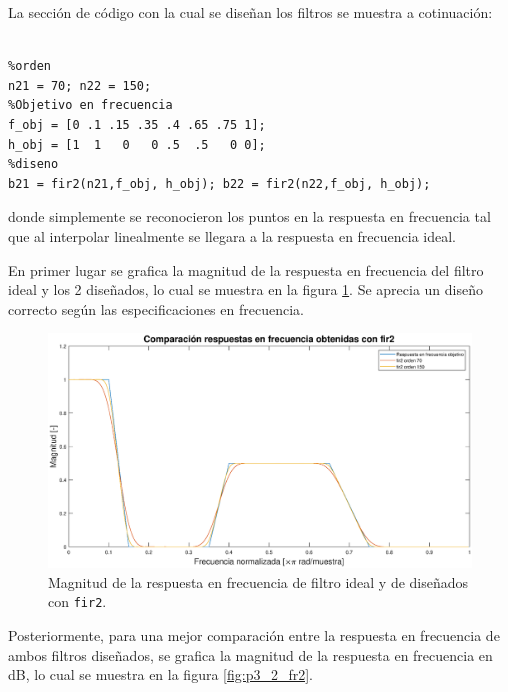 \begin{enumerate}
La sección de código con la cual se diseñan los filtros se muestra a cotinuación:
\begin{lstlisting}[frame = single]
%%% 2. Diseno de filtros FIR usando fir2

%orden 
n21 = 70; n22 = 150;
%Objetivo en frecuencia
f_obj = [0 .1 .15 .35 .4 .65 .75 1];
h_obj = [1  1   0   0 .5  .5   0 0];
%diseno
b21 = fir2(n21,f_obj, h_obj); b22 = fir2(n22,f_obj, h_obj);
\end{lstlisting}
donde simplemente se reconocieron los puntos en la respuesta en frecuencia tal que al interpolar linealmente se llegara a la respuesta en frecuencia ideal.

En primer lugar se grafica la magnitud de la respuesta en frecuencia del filtro ideal y los 2 diseñados, lo cual se muestra en la figura \ref{fig:p3_2_fr1}. Se aprecia un diseño correcto según las especificaciones en frecuencia.
\begin{figure}[H]
    \centering
    \includegraphics[width = .8 \linewidth]{Figuras/p1_32_FR1.eps}
    \caption{Magnitud de la respuesta en frecuencia de filtro ideal y de diseñados con \texttt{fir2}.}
    \label{fig:p3_2_fr1}
\end{figure}
Posteriormente, para una mejor comparación entre la respuesta en frecuencia de ambos filtros diseñados, se grafica la magnitud de la respuesta en frecuencia en dB, lo cual se muestra en la figura \ref{fig:p3_2_fr2}. 


\end{enumerate}
